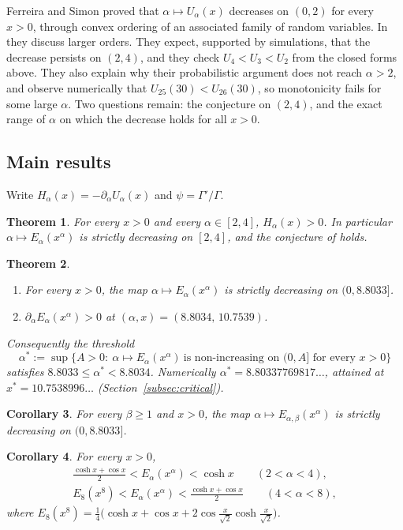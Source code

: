 \documentclass[11pt,a4paper]{article}
\theoremstyle{plain}
\newtheorem{theorem}{Theorem}[section]
\newtheorem{corollary}[theorem]{Corollary}
\theoremstyle{remark}
\begin{document}
Ferreira and Simon \cite[Theorem~A]{FS} proved that $\alpha\mapsto U_\alpha(x)$ decreases on
$(0,2)$ for every $x>0$, through convex ordering of an associated family of random variables.
In \cite[Remark~1(a)]{FS} they discuss larger orders. They expect, supported by simulations, that
the decrease persists on $(2,4)$, and they check $U_4<U_3<U_2$ from the closed forms above. They
also explain why their probabilistic argument does not reach $\alpha>2$, and observe numerically
that $U_{25}(30)<U_{26}(30)$, so monotonicity fails for some large $\alpha$. Two questions remain:
the conjecture on $(2,4)$, and the exact range of $\alpha$ on which the decrease holds for all $x>0$.

\subsection{Main results}
Write $H_\alpha(x)=-\partial_\alpha U_\alpha(x)$ and $\psi=\Gamma'/\Gamma$.

\begin{theorem}\label{thm:24}
For every $x>0$ and every $\alpha\in[2,4]$, $H_\alpha(x)>0$. In particular
$\alpha\mapsto E_\alpha(x^\alpha)$ is strictly decreasing on $[2,4]$, and the conjecture of
\cite[Remark~1(a)]{FS} holds.
\end{theorem}

\begin{theorem}\label{thm:sharp}
\begin{enumerate}
 \item[(i)] For every $x>0$, the map $\alpha\mapsto E_\alpha(x^\alpha)$ is strictly decreasing on
 $(0,8.8033]$.
 \item[(ii)] $\partial_\alpha E_\alpha(x^\alpha)>0$ at $(\alpha,x)=(8.8034,\,10.7539)$.
\end{enumerate}
Consequently the threshold
\[
 \alpha^*:=\sup\bigl\{A>0:\ \alpha\mapsto E_\alpha(x^\alpha)\ \text{is non-increasing on }(0,A]
 \text{ for every }x>0\bigr\}
\]
satisfies $8.8033\le\alpha^*<8.8034$. Numerically $\alpha^*=8.80337769817\ldots$, attained at
$x^*=10.7538996\ldots$ (Section~\ref{subsec:critical}).
\end{theorem}

\begin{corollary}\label{cor:beta}
For every $\beta\ge1$ and $x>0$, the map $\alpha\mapsto E_{\alpha,\beta}(x^\alpha)$ is strictly
decreasing on $(0,8.8033]$.
\end{corollary}

\begin{corollary}\label{cor:bounds}
For every $x>0$,
\begin{gather*}
 \frac{\cosh x+\cos x}{2}<E_\alpha(x^\alpha)<\cosh x\qquad(2<\alpha<4),\\
 E_8(x^8)<E_\alpha(x^\alpha)<\frac{\cosh x+\cos x}{2}\qquad(4<\alpha<8),
\end{gather*}
where
$E_8(x^8)=\tfrac14\bigl(\cosh x+\cos x+2\cos\tfrac{x}{\sqrt2}\cosh\tfrac{x}{\sqrt2}\bigr)$.
\end{corollary}
\end{document}
